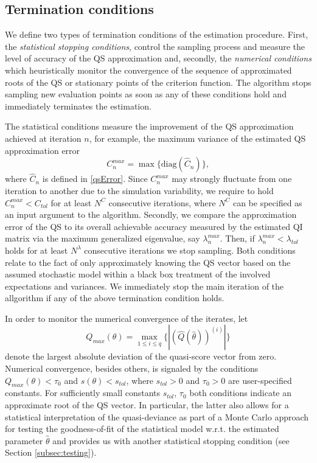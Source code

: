\documentclass[article, nojss]{jss}
\numberwithin{equation}{section}			%
\begin{document}
\subsection{Termination conditions}\label{subsec:termCond}
We define two types of termination conditions of the estimation procedure.
First, the \emph{statistical stopping conditions}, control the sampling
process and measure the level of accuracy of the QS approximation
and, secondly, the \emph{numerical conditions} which heuristically monitor the convergence
of the sequence of approximated roots of the QS or stationary points of the
criterion function. The algorithm stops sampling new evaluation points as soon as any
of these conditions hold and immediately terminates the estimation.\par
%
The statistical conditions measure the improvement of the QS approximation
achieved at iteration $n$, for example, the maximum variance of the estimated QS
approximation error
\[
    C^{max}_{n}=\max\{\text{diag}(\hat{C}_n)\},
\]
where $\hat{C}_n$ is defined in \eqref{qsError}. Since $C^{max}_n$ may strongly
fluctuate from one iteration to another due to the simulation variability,
we require to hold $C^{max}_n<C_{tol}$ for at least $N^C$ consecutive
iterations, where $N^C$ can be specified as an input argument to the algorithm.
Secondly, we compare the approximation error of the QS to its overall
achievable accuracy measured by the estimated QI matrix via the maximum generalized eigenvalue, say
$\lambda^{max}_{n}$. Then, if $\lambda^{max}_n<\lambda_{tol}$ holds for at least
$N^{\lambda}$ consecutive iterations we stop sampling. Both conditions relate to the fact of only approximately
knowing the QS vector based on the assumed stochastic model within a black box treatment of the
involved expectations and variances. We immediately stop the main iteration of
the allgorithm if any of the above termination condition holds.\par
In order to monitor the numerical convergence of the iterates, let
\[  
  Q_{max}(\theta) = \max_{1\leq i\leq q}\{|(\hat{Q}(\hat{\theta}))^{(i)}|\}
\]
denote the largest absolute deviation of the quasi-score vector from zero.
Numerical convergence, besides others, is signaled by the
conditions $Q_{max}(\theta)<\tau_0$ and $s(\theta)<s_{tol}$, where
$s_{tol}>0$ and $\tau_0>0$ are user-specified constants. For sufficiently
small constants $s_{tol}$, $\tau_0$ both conditions indicate an approximate
root of the QS vector. In particular, the latter also allows for a statistical
interpretation of the quasi-deviance as part of a Monte Carlo approach for
testing the goodness-of-fit of the statistical model w.r.t. the estimated parameter
$\hat{\theta}$ and provides us with another statistical stopping condition (see
Section \ref{subsec:testing}).
%
\end{document}
